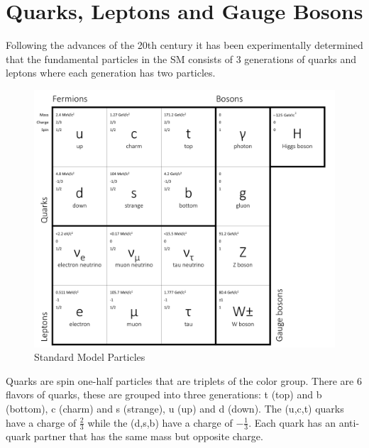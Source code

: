 \section{Quarks, Leptons and Gauge Bosons}
Following the advances of the 20th century it has been experimentally 
determined that the fundamental
particles in the SM consists of 3 generations of quarks and leptons
where each generation has two particles. 
\begin{figure}[hb]
  \centering
	\includegraphics[width=\textwidth]{images/SMParticles2.png}
  	\caption[SM Particles]
   	{Standard Model Particles}
	\label{fig:SMParticles}
\end{figure}
Quarks are spin one-half particles that are triplets of the color group. 
There are 6 flavors of quarks, these are grouped into three generations:
t (top) and b (bottom), c (charm) and s (strange), u (up) and d (down). 
The (u,c,t) quarks have a charge of $\frac{2}{3}$ while the (d,s,b) have 
a charge of $-\frac{1}{3}$.
Each quark has an anti-quark partner that has the same mass but opposite charge.

